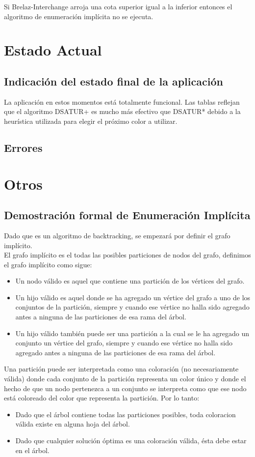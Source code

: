 \documentclass[a4paper,10pt]{article}
\begin{document}
Si Brelaz-Interchange arroja una cota superior igual a la inferior
entonces el algoritmo de enumeración implícita no se ejecuta.

\section{Estado Actual}
\subsection{Indicación del estado final de la aplicación}
La aplicación en estos momentos está totalmente funcional. Las tablas 
reflejan que el algoritmo DSATUR+ es mucho más efectivo que DSATUR* debido 
a la heurística utilizada para elegir el próximo color a utilizar.
\subsection{Errores}

\section{Otros}
\subsection{Demostración formal de Enumeración Implícita}
Dado que es un algoritmo de backtracking, se empezar\'a por definir el
grafo impl\'icito.\\
\indent El grafo impl\'icito es el todas las posibles particiones de
nodos del grafo, definimos el grafo impl\'icito como sigue:
\begin{itemize}
 \item Un nodo v\'alido es aquel que contiene una partici\'on de los
       v\'ertices del grafo. 
 \item Un hijo v\'alido es aquel donde se ha agregado un v\'ertice del
       grafo a uno de los conjuntos de la partici\'on, siempre y cuando
       ese v\'ertice no halla sido agregado antes a ninguna de las
       particiones de esa rama del \'arbol.
 \item Un hijo v\'alido tambi\'en puede ser una partici\'on a la cual se
       le ha agregado un conjunto un v\'ertice del grafo, siempre y
       cuando ese v\'ertice no halla sido agregado antes a ninguna de
       las particiones de esa rama del \'arbol.
\end{itemize}
\indent Una partici\'on puede ser interpretada como una coloraci\'on (no
necesariamente v\'alida) donde cada conjunto de la partici\'on
representa un color \'unico y donde el hecho de que un nodo pertenezca a
un conjunto se interpreta como que ese nodo est\'a coloreado del color
que representa la partici\'on.
Por lo tanto:
\begin{itemize}
 \item Dado que el \'arbol contiene todas las particiones posibles,
 toda coloracion v\'alida existe en alguna hoja del \'arbol.
 \item Dado que cualquier soluci\'on \'optima es una coloraci\'on
 v\'alida, \'esta debe estar en el \'arbol.
\end{itemize}
\end{document}
